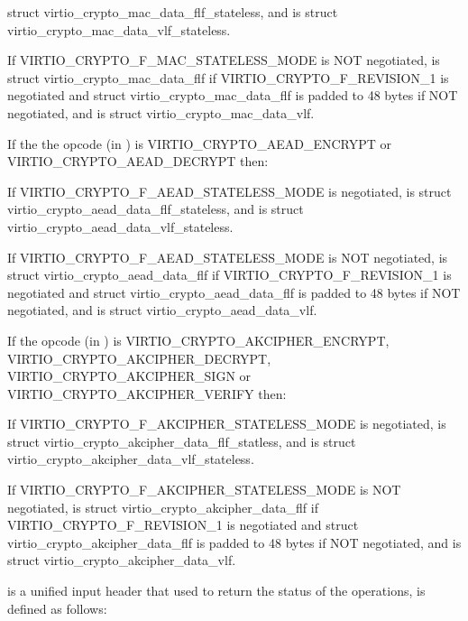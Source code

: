 \begin{itemize*}
\begin{itemize*}
        struct virtio_crypto_mac_data_flf_stateless, and  is struct
        virtio_crypto_mac_data_vlf_stateless.
    \item If VIRTIO_CRYPTO_F_MAC_STATELESS_MODE is NOT negotiated, 
        is struct virtio_crypto_mac_data_flf if VIRTIO_CRYPTO_F_REVISION_1 is negotiated
        and struct virtio_crypto_mac_data_flf is padded to 48 bytes if NOT negotiated,
        and  is struct virtio_crypto_mac_data_vlf.
    \end{itemize*}
\item If the the opcode (in ) is VIRTIO_CRYPTO_AEAD_ENCRYPT
    or VIRTIO_CRYPTO_AEAD_DECRYPT then:
    \begin{itemize*}
    \item If VIRTIO_CRYPTO_F_AEAD_STATELESS_MODE is negotiated,  is
        struct virtio_crypto_aead_data_flf_stateless, and  is struct
        virtio_crypto_aead_data_vlf_stateless.
    \item If VIRTIO_CRYPTO_F_AEAD_STATELESS_MODE is NOT negotiated, 
        is struct virtio_crypto_aead_data_flf if VIRTIO_CRYPTO_F_REVISION_1 is negotiated
        and struct virtio_crypto_aead_data_flf is padded to 48 bytes if NOT negotiated,
        and  is struct virtio_crypto_aead_data_vlf.
    \end{itemize*}
\item If the opcode (in ) is VIRTIO_CRYPTO_AKCIPHER_ENCRYPT, VIRTIO_CRYPTO_AKCIPHER_DECRYPT,
    VIRTIO_CRYPTO_AKCIPHER_SIGN or VIRTIO_CRYPTO_AKCIPHER_VERIFY then:
    \begin{itemize*}
    \item If VIRTIO_CRYPTO_F_AKCIPHER_STATELESS_MODE is negotiated,  is
        struct virtio_crypto_akcipher_data_flf_statless, and  is struct
        virtio_crypto_akcipher_data_vlf_stateless.
    \item If VIRTIO_CRYPTO_F_AKCIPHER_STATELESS_MODE is NOT negotiated, 
        is struct virtio_crypto_akcipher_data_flf if VIRTIO_CRYPTO_F_REVISION_1 is negotiated
        and struct virtio_crypto_akcipher_data_flf is padded to 48 bytes if NOT negotiated,
        and  is struct virtio_crypto_akcipher_data_vlf.
    \end{itemize*}
\end{itemize*}

 is a unified input header that used to return the status of
the operations, is defined as follows:

